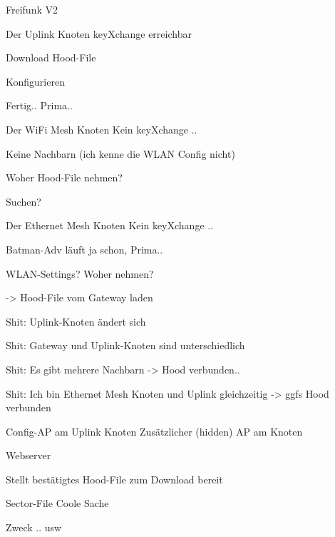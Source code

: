 \begin{frame}{Freifunk V2}
    \center
\end{frame}

\begin{frame}{Der Uplink Knoten}
    keyXchange erreichbar

    Download Hood-File

    Konfigurieren

    Fertig.. Prima..
\end{frame}

\begin{frame}{Der WiFi Mesh Knoten}
    Kein keyXchange ..

    Keine Nachbarn (ich kenne die WLAN Config nicht)

    Woher Hood-File nehmen?

    Suchen?
\end{frame}

\begin{frame}{Der Ethernet Mesh Knoten}
    Kein keyXchange ..

    Batman-Adv läuft ja schon, Prima..

    WLAN-Settings? Woher nehmen?
    
    -> Hood-File vom Gateway laden

    Shit: Uplink-Knoten ändert sich

    Shit: Gateway und Uplink-Knoten sind unterschiedlich

    Shit: Es gibt mehrere Nachbarn -> Hood verbunden..

    Shit: Ich bin Ethernet Mesh Knoten und Uplink gleichzeitig -> ggfs Hood verbunden
\end{frame}

\begin{frame}{Config-AP am Uplink Knoten}
    Zusätzlicher (hidden) AP am Knoten

    Webserver

    Stellt bestätigtes Hood-File zum Download bereit
\end{frame}

\begin{frame}{Sector-File}
    Coole Sache

    Zweck .. usw
\end{frame}
